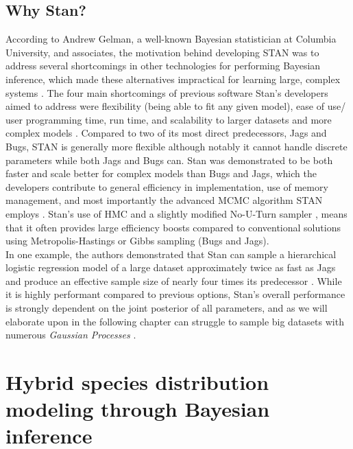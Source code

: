 \documentclass[
  12pt,
  twoside]{book}
\theoremstyle{definition}
\theoremstyle{definition}
\theoremstyle{definition}
\theoremstyle{remark}
\begin{document}
\hypertarget{why-stan}{%
\section{Why Stan?}\label{why-stan}}

According to Andrew Gelman, a well-known Bayesian statistician at Columbia University, and associates, the motivation behind developing STAN was to address several shortcomings in other technologies for performing Bayesian inference, which made these alternatives impractical for learning large, complex systems \citep{Gelman2015}.
The four main shortcomings of previous software Stan's developers aimed to address were flexibility (being able to fit any given model), ease of use/ user programming time, run time, and scalability to larger datasets and more complex models \citep{Gelman2015}.
Compared to two of its most direct predecessors, Jags and Bugs, STAN is generally more flexible although notably it cannot handle discrete parameters while both Jags and Bugs can.
Stan was demonstrated to be both faster and scale better for complex models than Bugs and Jags, which the developers contribute to general efficiency in implementation, use of memory management, and most importantly the advanced MCMC algorithm STAN employs \citep{Gelman2015}.
Stan's use of HMC \citep{Brooks2011} and a slightly modified No-U-Turn sampler \citep{Homan2014}, means that it often provides large efficiency boosts compared to conventional solutions using Metropolis-Hastings or Gibbs sampling (Bugs and Jags).\\
In one example, the authors demonstrated that Stan can sample a hierarchical logistic regression model of a large dataset approximately twice as fast as Jags and produce an effective sample size of nearly four times its predecessor \citep{Gelman2015}.
While it is highly performant compared to previous options, Stan's overall performance is strongly dependent on the joint posterior of all parameters, and as we will elaborate upon in the following chapter can struggle to sample big datasets with numerous \emph{Gaussian Processes} \citep{Gelman2015}.

\hypertarget{hybrid-species-distribution-modeling-through-bayesian-inference}{%
\chapter{Hybrid species distribution modeling through Bayesian inference}\label{hybrid-species-distribution-modeling-through-bayesian-inference}}
\end{document}
